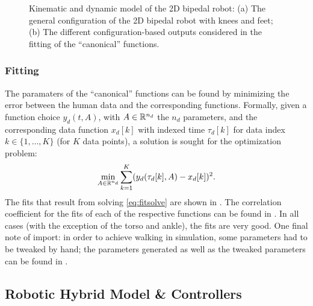 \begin{figure}[t!]
  \centering
  \hspace{.2cm}
  \caption[Kinematic and dynamic model of the 2D bipedal robot.]{Kinematic and
    dynamic model of the 2D bipedal robot:
    (a) The general configuration of the 2D bipedal robot with knees and feet;
    (b) The different configuration-based outputs considered in the fitting of
    the ``canonical'' functions.}
  \label{fig:robotconstraints}
\end{figure}


\subsubsection{Fitting}

The paramaters of the ``canonical'' functions can be found by minimizing the
error between the human data and the corresponding functions.
%
Formally, given a function choice $y_d(t, A)$, with $A \in \mathbb{R}^{n_{d}}$ the $n_d$
parameters, and the corresponding data function $x_{d}[k]$ with indexed time
$\tau_{d}[k]$ for data index $k \in \{1, \ldots, K\}$ (for $K$ data points), a
solution is sought for the optimization problem:
%
\begin{align}
  \label{eq:fitsolve}
  \min_{A \in \mathbb{R}^{n_{d}}} \sum_{k=1}^{K} (y_{d}(\tau_{d}[k], A) - x_{d}[k])^2.
\end{align}
%
The fits that result from solving \eqref{eq:fitsolve} are shown in
.
%
The correlation coefficient for the fits of each of the respective functions can
be found in .
%
In all cases (with the exception of the torso and ankle), the fits are very
good.
%
One final note of import:
%
in order to achieve walking in simulation, some parameters had to be tweaked by
hand;
%
the parameters generated as well as the tweaked parameters can be found in
.





\subsection{Robotic Hybrid Model \& Controllers}


